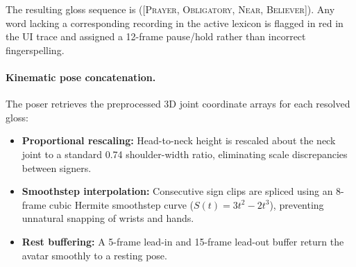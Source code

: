 The resulting gloss sequence is  (\textsc{[Prayer, Obligatory, Near, Believer]}). Any word lacking a corresponding recording in the active lexicon is flagged in red in the UI trace and assigned a 12-frame pause/hold rather than incorrect fingerspelling.

\paragraph{Kinematic pose concatenation.} The poser retrieves the preprocessed 3D joint coordinate arrays for each resolved gloss:
\begin{itemize}[leftmargin=*,itemsep=1pt]
  \item \textbf{Proportional rescaling:} Head-to-neck height is rescaled about the neck joint to a standard 0.74 shoulder-width ratio, eliminating scale discrepancies between signers.
  \item \textbf{Smoothstep interpolation:} Consecutive sign clips are spliced using an 8-frame cubic Hermite smoothstep curve ($S(t) = 3t^2 - 2t^3$), preventing unnatural snapping of wrists and hands.
  \item \textbf{Rest buffering:} A 5-frame lead-in and 15-frame lead-out buffer return the avatar smoothly to a resting pose.
\end{itemize}

